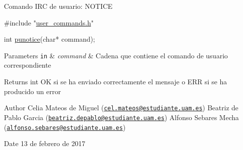 Comando I\-R\-C de usuario\-: N\-O\-T\-I\-C\-E


\begin{DoxyCode}
\textcolor{preprocessor}{#include "\hyperlink{user__commands_8h}{user\_commands.h}"}

\textcolor{keywordtype}{int} \hyperlink{user__commands_8h_a4dd6e13bec86782e1c29bc67c6040b95}{punotice}(\textcolor{keywordtype}{char}* command);
\end{DoxyCode}



\begin{DoxyParams}[1]{Parameters}
\mbox{\tt in}  & {\em command} & Cadena que contiene el comando de usuario correspondiente\\
\hline
\end{DoxyParams}
\begin{DoxyReturn}{Returns}
int O\-K si se ha enviado correctamente el mensaje o E\-R\-R si se ha producido un error
\end{DoxyReturn}
\begin{DoxyAuthor}{Author}
Celia Mateos de Miguel (\href{mailto:cel.mateos@estudiante.uam.es}{\tt cel.\-mateos@estudiante.\-uam.\-es}) Beatriz de Pablo Garcia (\href{mailto:beatriz.depablo@estudiante.uam.es}{\tt beatriz.\-depablo@estudiante.\-uam.\-es}) Alfonso Sebares Mecha (\href{mailto:alfonso.sebares@estudiante.uam.es}{\tt alfonso.\-sebares@estudiante.\-uam.\-es})
\end{DoxyAuthor}
\begin{DoxyDate}{Date}
13 de febrero de 2017
\end{DoxyDate}


 